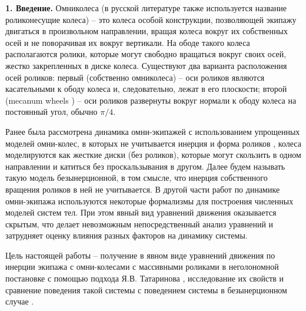 {\bf 1. Введение.}
Омниколеса (в русской литературе также используется название роликонесущие колеса) -- это колеса особой конструкции, позволяющей экипажу двигаться в произвольном направлении, вращая колеса вокруг их собственных осей и не поворачивая их вокруг вертикали. На ободе такого колеса располагаются ролики, которые могут свободно вращаться вокруг своих осей, жестко закрепленных в диске колеса. Существуют два варианта расположения осей роликов: первый  (собственно омниколеса) -- оси роликов являются касательными к ободу колеса и, следовательно, лежат в его плоскости; второй (mecanum wheels \cite{mecanum}) -- оси роликов развернуты вокруг нормали к ободу колеса на постоянный угол, обычно $\pi/4$.

Ранее была рассмотрена динамика омни-экипажей с использованием упрощенных моделей омни-колес, в которых не учитывается инерция и форма роликов \cite{ZobovaTatarinovPMM, formalskii, borisov, ZobovaTatarinovAspecty2006, zobova2008svobodnye8020851, Martynenko2010}, колеса моделируются как жесткие диски (без роликов), которые могут скользить в одном направлении и катиться без проскальзывания в другом. Далее будем называть такую модель безынерционной, в том смысле, что инерция собственного вращения роликов в ней не учитывается. В другой части работ по динамике омни-экипажа \cite{KosenkoGerasimov, Tobolar, Williams2002, Ashmore2002} используются некоторые формализмы для построения численных моделей систем тел. При этом явный вид уравнений движения оказывается скрытым, что делает невозможным непосредственный  анализ уравнений и затрудняет оценку влияния разных факторов на динамику системы.


Цель настоящей работы -- получение в явном виде уравнений движения по инерции экипажа с омни-колесами с массивными роликами в неголономной постановке с помощью подхода Я.В. Татаринова \cite{Tatarinov}, исследование их свойств и сравнение поведения такой системы с поведением системы в безынерционном случае \cite{Zobova2011}.
